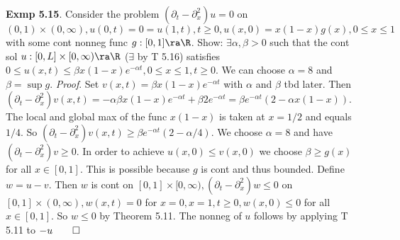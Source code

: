 {\bf Exmp 5.15}. Consider the problem $(\partial_t - \partial_x^2)u=0$ on $(0,1) \times (0, \infty), u(0,t)=0=u(1,t), t \geq 0, u(x,0)=x(1-x)g(x), 0 \leq x \leq 1$ with some cont nonneg func $g: [0,1] \ra \R$. Show: $ \exists \alpha, \beta >0$ such that the cont sol $u: [0,L] \times [0,\infty) \ra \R$ ($\exists$ by T 5.16) satisfies $0 \leq u(x,t) \leq \beta x(1-x)e^{-\alpha t}, 0 \leq x \leq 1, t \geq 0$. We can choose $\alpha = 8$ and $\beta = \sup g$. {\it Proof}. Set $v(x,t)=\beta x (1-x)e^{-\alpha t}$ with $\alpha$ and $\beta$ tbd later.  Then $(\partial_t - \partial_x^2)v(x,t) = - \alpha \beta x(1-x)e^{-\alpha t} + \beta 2 e^{-\alpha t} = \beta e^{-\alpha t}(2-\alpha x(1-x))$. The local and global max of the func $x(1-x)$ is taken at $x = 1/2$ and equals $1/4$. So $(\partial_t - \partial_x^2)v(x,t) \geq \beta e^{-\alpha t}(2-\alpha/4)$. We choose $\alpha = 8$ and have $(\partial_t - \partial_x^2)v \geq 0$. In order to achieve $u(x,0)\leq v(x,0)$ we choose $\beta \geq g(x)$ for all $x \in [0,1]$. This is possible because $g$ is cont and thus bounded.  Define $ w = u - v$. Then $w$ is cont on $[0,1] \times [0, \infty), (\partial_t - \partial_x^2)w \leq 0$ on $[0,1] \times (0, \infty), w(x,t) = 0$ for $x = 0, x = 1, t \geq 0, w(x,0) \leq 0$ for all $x \in [0,1]$. So $w \leq 0$ by Theorem 5.11. The nonneg of $u$ follows by applying T 5.11 to $-u \qed$